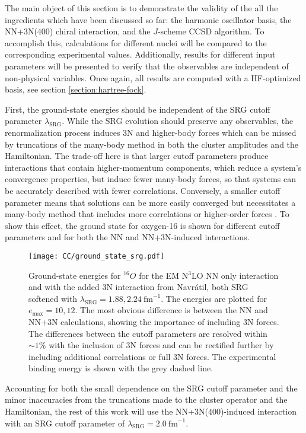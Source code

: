 \documentclass[thesis.tex]{subfiles}
\begin{document}
The main object of this section is to demonstrate the validity of the all the ingredients which have been discussed so far: the harmonic oscillator basis, the NN+3N(400) chiral interaction, and the $J$-scheme CCSD algorithm.  To accomplish this, calculations for different nuclei will be compared to the corresponding experimental values.  Additionally, results for different input parameters will be presented to verify that the observables are independent of non-physical variables.  Once again, all results are computed with a HF-optimized basis, see section \ref{section:hartree-fock}.

First, the ground-state energies should be independent of the SRG cutoff parameter $\lambda_{\mathrm{SRG}}$.  While the SRG evolution should preserve any observables, the renormalization process induces 3N and higher-body forces which can be missed by truncations of the many-body method in both the cluster amplitudes and the Hamiltonian.  The trade-off here is that larger cutoff parameters produce interactions that contain higher-momentum components, which reduce a system's convergence properties, but induce fewer many-body forces, so that systems can be accurately described with fewer correlations.  Conversely, a smaller cutoff parameter means that solutions can be more easily converged but necessitates a many-body method that includes more correlations or higher-order forces \cite{ROTH2012}.  To show this effect, the ground state for oxygen-16 is shown for different cutoff parameters and for both the NN and NN+3N-induced interactions.  
\begin{figure}[h!]
  \centering
  \texttt{[image: CC/ground\_state\_srg.pdf]}
  \caption{Ground-state energies for ${}^{16}O$ for the EM N$^{3}$LO NN only interaction and with the added 3N interaction from Navr\'{a}til, both SRG softened with $\lambda_{\mathrm{SRG}}=1.88,2.24\ \mathrm{fm}^{-1}$.  The energies are plotted for $e_\mathrm{max}=10,12$.  The most obvious difference is between the NN and NN+3N calculations, showing the importance of including 3N forces.  The differences between the cutoff parameters are resolved within $\sim 1\%$ with the inclusion of 3N forces and can be rectified further by including additional correlations or full 3N forces.  The experimental binding energy is shown with the grey dashed line.}
  \label{fig:Ground_State_srg}
\end{figure}
Accounting for both the small dependence on the SRG cutoff parameter and the minor inaccuracies from the truncations made to the cluster operator and the Hamiltonian, the rest of this work will use the NN+3N(400)-induced interaction with an SRG cutoff parameter of $\lambda_{\mathrm{SRG}}=2.0\ \mathrm{fm}^{-1}$.
\end{document}
